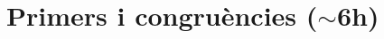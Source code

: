 \documentclass[11pt,fleqn]{book} %
\newcounter{let} \setcounter{let}{0}
\renewcommand{\1}{\mathbf{1}}
\newcommand{\0}{\mathbf{0}}
\begin{document}
\usechapterimagefalse %

\pagestyle{empty} %

\tableofcontents %

\cleardoublepage %

\pagestyle{fancy} %




\usechapterimagefalse
\chapter{Primers i congruències \texorpdfstring{($\sim$6h)}{}}
{
\let\subsection\section
\let\subsubsection\subsection
\let\paragraph\subsubsection

}
\end{document}
